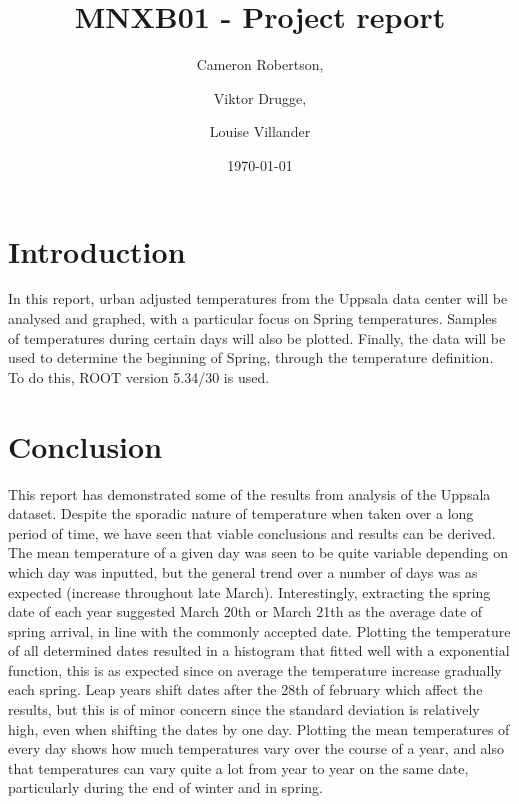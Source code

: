 \documentclass[a4paper,12pt]{article}
\title{\textbf{MNXB01} - Project report}
\date{\today}
\author{Cameron Robertson, \and Viktor Drugge, \and Louise Villander}
\begin{document}
	\maketitle
	\section{Introduction}
	\label{sec:pre}
	In this report, urban adjusted temperatures from the Uppsala data center will be analysed
	and graphed, with a particular focus on Spring temperatures. Samples of temperatures during certain
	days will also be plotted. Finally, the data will be used to determine the beginning of Spring, through
	the temperature definition. To do this, ROOT version 5.34/30 is used.
	
	
	
	
	\section{Conclusion}
	\label{sec:con}
	This report has demonstrated some of the results from analysis of the Uppsala dataset. Despite the sporadic nature of temperature when 
	taken over a long period of time, we have seen that viable conclusions and results can be derived. The mean temperature of a given day was seen to be quite variable depending on 
	which day was inputted, but the general trend over a number of days was as expected (increase throughout late March). Interestingly, extracting the spring date of each year
	suggested March 20th or March 21th as the average date of spring arrival, in line with the commonly accepted date. Plotting the temperature of all determined dates resulted in a 
	histogram that fitted well with a exponential function, this is as expected since on average the temperature increase gradually each spring. Leap years shift dates after the 28th
	of february which affect the results, but this is of minor concern since the standard deviation is relatively high, even when shifting the dates by one day. Plotting the mean temperatures
	of every day shows how much temperatures vary over the course of a year, and also that temperatures can vary quite a lot from year to year on the same date, particularly during the end 
	of winter and in spring.
\end{document}
